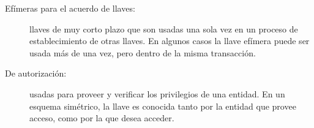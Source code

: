 \begin{description}
  \item[Efímeras para el acuerdo de llaves:] llaves de muy corto plazo que son
    usadas una sola vez en un proceso de establecimiento de otras llaves. En
    algunos casos la llave efímera puede ser usada más de una vez, pero dentro
    de la misma transacción.

  \item[De autorización:] usadas para proveer y verificar los privilegios de
    una entidad. En un esquema simétrico, la llave es conocida tanto por la
    entidad que provee acceso, como por la que desea acceder.

\end{description}

%
%
%
%
%
%
%
%
%

